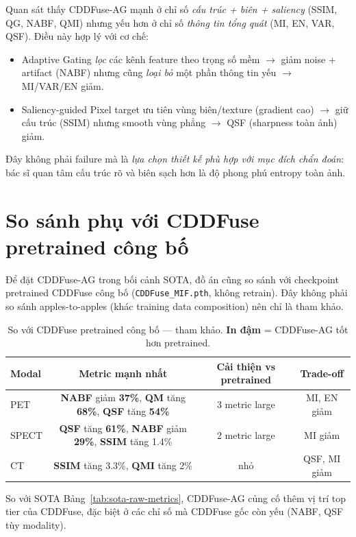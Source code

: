 Quan sát thấy CDDFuse-AG mạnh ở chỉ số \emph{cấu trúc + biên + saliency} (SSIM, QG, NABF, QMI) nhưng yếu hơn ở chỉ số \emph{thông tin tổng quát} (MI, EN, VAR, QSF). Điều này hợp lý với cơ chế:
\begin{itemize}\itemsep0pt
    \item Adaptive Gating \emph{lọc} các kênh feature theo trọng số mềm $\to$ giảm noise + artifact (NABF) nhưng cũng \emph{loại bỏ} một phần thông tin yếu $\to$ MI/VAR/EN giảm.
    \item Saliency-guided Pixel target ưu tiên vùng biên/texture (gradient cao) $\to$ giữ cấu trúc (SSIM) nhưng smooth vùng phẳng $\to$ QSF (sharpness toàn ảnh) giảm.
\end{itemize}
Đây không phải failure mà là \emph{lựa chọn thiết kế phù hợp với mục đích chẩn đoán}: bác sĩ quan tâm cấu trúc rõ và biên sạch hơn là độ phong phú entropy toàn ảnh.

\section{So sánh phụ với CDDFuse pretrained công bố}
\label{sec:results-vs-pretrained}

Để đặt CDDFuse-AG trong bối cảnh SOTA, đồ án cũng so sánh với checkpoint pretrained CDDFuse công bố (\texttt{CDDFuse\_MIF.pth}, không retrain). Đây không phải so sánh apples-to-apples (khác training data composition) nên chỉ là tham khảo.

\begin{table}[h]
\centering
\small
\caption{So với CDDFuse pretrained công bố --- tham khảo. \textbf{In đậm} = CDDFuse-AG tốt hơn pretrained.}
\label{tab:vs-pretrained}
\begin{tabular}{lccc}
\toprule
\textbf{Modal} & \textbf{Metric mạnh nhất} & \textbf{Cải thiện vs pretrained} & \textbf{Trade-off} \\
\midrule
PET   & \textbf{NABF} giảm \textbf{37\%}, \textbf{QM} tăng \textbf{68\%}, \textbf{QSF} tăng \textbf{54\%} & 3 metric large & MI, EN giảm \\
SPECT & \textbf{QSF} tăng \textbf{61\%}, \textbf{NABF} giảm \textbf{29\%}, \textbf{SSIM} tăng 1.4\% & 2 metric large & MI giảm \\
CT    & \textbf{SSIM} tăng 3.3\%, \textbf{QMI} tăng 2\% & nhỏ & QSF, MI giảm \\
\bottomrule
\end{tabular}
\end{table}

So với SOTA Bảng~\ref{tab:sota-raw-metrics}, CDDFuse-AG củng cố thêm vị trí top tier của CDDFuse, đặc biệt ở các chỉ số mà CDDFuse gốc còn yếu (NABF, QSF tùy modality).
